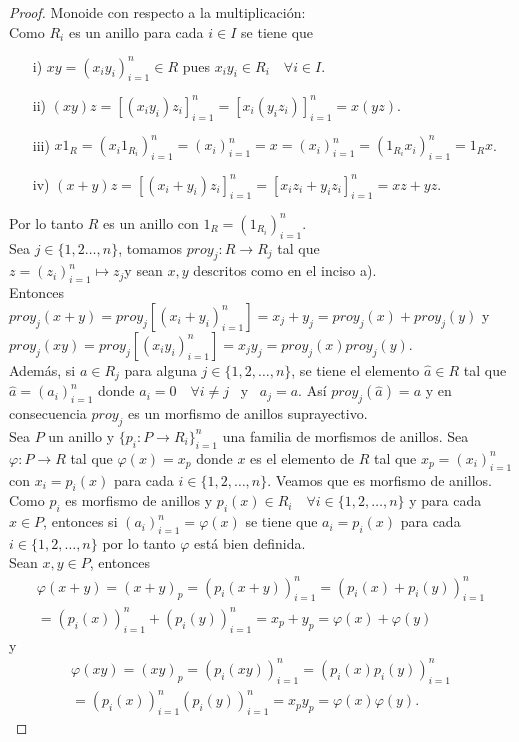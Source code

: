 \documentclass{article}
\begin{document}
\begin{enumerate}[label=\textbf{Ej \arabic*.}]
\begin{proof}
Monoide con respecto a la multiplicación:\\

Como $R_i$ es un anillo para cada $i\in I$ se tiene que
\begin{itemize}
\item[i)] $xy=(x_iy_i)_{i=1}^n\in R$ pues $x_iy_i\in R_i\quad \forall i\in I$.
\item[ii)] $(xy)z=[(x_iy_i)z_i]_{i=1}^n=[x_i(y_iz_i)]_{i=1}^n=x(yz)$.
\item[iii)] $x1_R=(x_i1_{R_i})_{i=1}^n=(x_i)_{i=1}^n=x=(x_i)_{i=1}^n=(1_{R_i}x_i)_{i=1}^n=1_Rx$.
\item[iv)] $(x+y)z=[(x_i+y_i)z_i]^n_{i=1}=[x_iz_i+y_iz_i]^n_{i=1}=xz+yz.$
\end{itemize}
Por lo tanto $R$ es un anillo con $1_R=(1_{R_i})_{i=1}^n$.\\

 Sea $j\in \{1,2\ldots,n\}$, tomamos $proy_j:R\to R_j$ tal que \\
$z=(z_i)_{i=1}^n\mapsto z_j$\quad y sean $x,y$ descritos como en el inciso a).\\

Entonces $proy_j(x+y)=proy_j[(x_i+y_i)_{i=1}^n] =x_j+y_j=proy_j(x)+proy_j(y)$ y 
$proy_j(xy)=proy_j[(x_iy_i)_{i=1}^n] =x_jy_j=proy_j(x)proy_j(y)$.\\

Además, si $a\in R_j$ para alguna $j\in \{1,2,\ldots,n\}$, 
se tiene el elemento $\hat{a}\in R$ tal que $\hat{a}=(a_i)_{i=1}^n$ donde $a_i=0\quad \forall i\neq j$ \, y \, $a_j=a$.
Así $proy_j(\hat{a})=a$ y en consecuencia $proy_j$ es un morfismo de anillos suprayectivo.\\

 Sea $P$ un anillo y $\{p_i:P\to R_i\}_{i=1}^n$ una familia de morfismos de anillos. Sea $\varphi:P\to R$ tal que $\varphi(x)=x_p$ donde 
$x$ es el elemento de $R$ tal que $x_p=(x_i)^n_{i=1}$ con $x_i=p_i(x)$ para cada $i\in \{1,2,\ldots,n\}$. Veamos que es morfismo de anillos.\\

Como $p_i$ es morfismo de anillos y $p_i(x)\in R_i\quad \forall i\in \{1,2,\ldots,n\}$ y para cada $x\in P$, 
entonces si $(a_i)_{i=1}^n=\varphi(x)$ se tiene que 
$a_i=p_i(x)$ para cada $i\in \{1,2,\ldots,n\}$ por lo tanto $\varphi$ está bien definida.\\

Sean $x,y\in P$, entonces 
\begin{gather*}
\varphi(x+y)=(x+y)_p=(p_i(x+y))_{i=1}^n=(p_i(x)+p_i(y))_{i=1}^n\\
=(p_i(x))_{i=1}^n+(p_i(y))_{i=1}^n=x_p+y_p=\varphi(x)+\varphi(y)
\end{gather*}
y
\begin{gather*}
\varphi(xy)=(xy)_p=(p_i(xy))_{i=1}^n=(p_i(x)p_i(y))_{i=1}^n\\
=(p_i(x))_{i=1}^n(p_i(y))_{i=1}^n=x_py_p=\varphi(x)\varphi(y).
\end{gather*}


\end{proof}
\end{enumerate}
\end{document}
